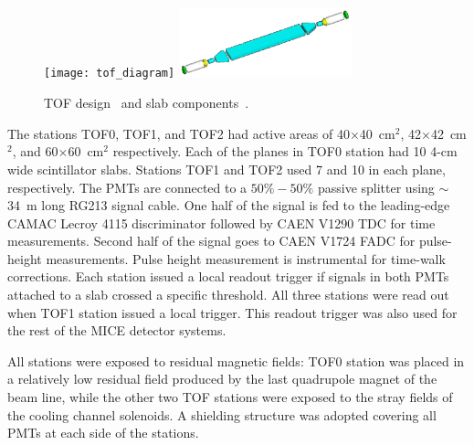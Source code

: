\begin{figure}[!ht]
  \centering
  \texttt{[image: tof\_diagram]}
  \includegraphics[width=5cm]{slab_design}
  \caption{TOF design~\cite{Rayner:2011zz} and slab components~\cite{NOTE241}.}
  \label{fig:tof:schematic}
\end{figure}

The stations TOF0, TOF1, and TOF2 had active areas of
40$\times$40~cm$^2$, 42$\times$42~cm$^2$, and 60$\times$60~cm$^2$
respectively.  Each of the planes in TOF0 station had 10 4-cm wide
scintillator slabs. Stations TOF1 and TOF2 used 7 and
10 in each plane, respectively.
The PMTs are connected to a $50\%-50\%$ passive splitter using
$\sim$34~m long RG213 signal cable. One half of the signal is fed to
the leading-edge CAMAC Lecroy 4115 discriminator followed by CAEN
V1290 TDC for time measurements. Second half of the signal goes to
CAEN V1724 FADC for pulse-height measurements. Pulse height
measurement is instrumental for time-walk corrections. Each station
issued a local readout trigger if signals in both PMTs attached to a
slab crossed a specific threshold. All three stations were read out when
TOF1 station issued a local trigger. This readout trigger was also
used for the rest of the MICE detector systems.




All stations were exposed to residual magnetic fields: TOF0 station was placed in a relatively low residual field produced by the last quadrupole magnet of the beam line, while the other two TOF stations were exposed to the stray fields of the cooling channel solenoids. A shielding structure was adopted covering all PMTs at each side of the stations.

